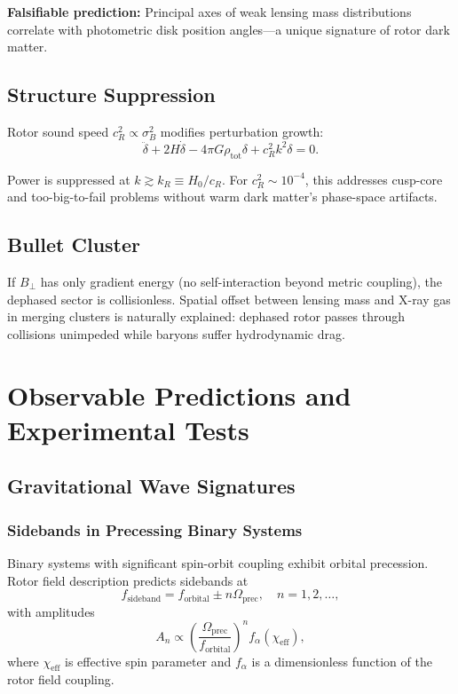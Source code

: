 \documentclass[11pt,a4paper]{article}
\numberwithin{equation}{section}
\theoremstyle{plain}
\theoremstyle{definition}
\theoremstyle{remark}
\begin{document}
\textbf{Falsifiable prediction:} Principal axes of weak lensing mass distributions correlate with photometric disk position angles—a unique signature of rotor dark matter.

\subsection{Structure Suppression}

Rotor sound speed $c_R^2 \propto \sigma_B^2$ modifies perturbation growth:
\begin{equation}
\ddot{\delta} + 2H\dot{\delta} - 4\pi G\rho_{\mathrm{tot}}\delta + c_R^2 k^2\delta = 0.
\end{equation}

Power is suppressed at $k \gtrsim k_R \equiv H_0/c_R$. For $c_R^2 \sim 10^{-4}$, this addresses cusp-core and too-big-to-fail problems without warm dark matter's phase-space artifacts.

\subsection{Bullet Cluster}

If $B_\perp$ has only gradient energy (no self-interaction beyond metric coupling), the dephased sector is collisionless. Spatial offset between lensing mass and X-ray gas in merging clusters is naturally explained: dephased rotor passes through collisions unimpeded while baryons suffer hydrodynamic drag.

\section{Observable Predictions and Experimental Tests}
\label{sec:predictions}

\subsection{Gravitational Wave Signatures}

\subsubsection{Sidebands in Precessing Binary Systems}

Binary systems with significant spin-orbit coupling exhibit orbital precession. Rotor field description predicts sidebands at
\begin{equation}
f_{\mathrm{sideband}} = f_{\mathrm{orbital}} \pm n\Omega_{\mathrm{prec}}, \quad n = 1,2,\ldots,
\label{eq:gw-sidebands}
\end{equation}
with amplitudes
\begin{equation}
A_n \propto \left(\frac{\Omega_{\mathrm{prec}}}{f_{\mathrm{orbital}}}\right)^n f_{\alpha}(\chi_{\mathrm{eff}}),
\end{equation}
where $\chi_{\mathrm{eff}}$ is effective spin parameter and $f_{\alpha}$ is a dimensionless function of the rotor field coupling.
\end{document}
